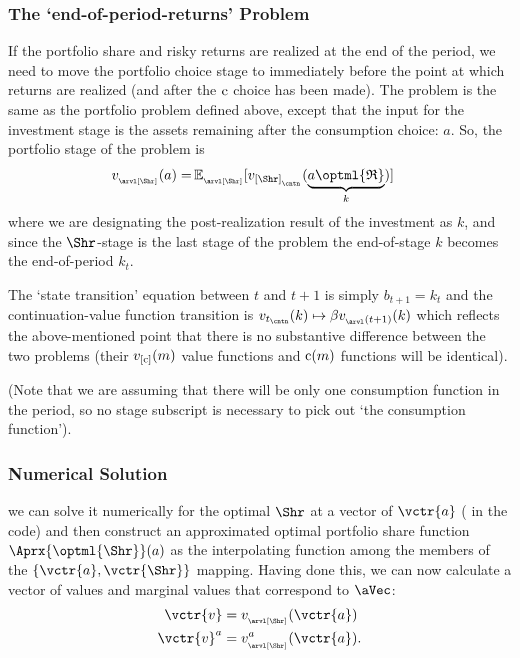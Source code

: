 \documentclass[titlepage, headings=optiontotocandhead]{Resources/texmf-local/tex/latex/econtex}
\begin{document}
\subsubsection{The `end-of-period-returns' Problem}

If the portfolio share and risky returns are realized at the end of the {period}, we need to move the portfolio choice {stage} to immediately before the point at which returns are realized (and after the $\mathrm{c}$ choice has been made).  The problem is the same as the portfolio problem defined above, except that the input for the investment {stage} is the assets remaining after the consumption choice: $a$.  So, the portfolio {stage} of the problem is
\begin{equation}\begin{gathered}\begin{aligned}
  v_{_\arvl[\Shr]}(a) = & \Ex_{_\arvl[\Shr]}[v_{[\Shr]_{_\cntn}}(\underbrace{a\optml{\Rport}}_{k})] %
    \end{aligned}\end{gathered}\end{equation}
where we are designating the post-realization result of the investment as $k$, and since the $\Shr$-{stage} is the last {stage} of the problem the end-of-{stage} $k$ becomes the end-of-{period} $k_{t}.$ 

The `state transition' equation between $t$ and $t+1$ is simply $b_{t+1} = k_{t}$ and the continuation-value function transition is $v_{t_\cntn}(k) \mapsto \beta v_{_\arvl(t+1)}(k)$ which reflects the above-mentioned point that there is no substantive difference between the two problems (their $v_{[\mathrm{c}]}(m)$ value functions and $\mathrm{c}(m)$ functions will be identical).

(Note that we are assuming that there will be only one consumption function in the period, so no {stage} subscript is necessary to pick out `the consumption function'). 

\subsubsection{Numerical Solution}
we can solve it numerically for the optimal $\Shr$ at a vector of $\vctr{a}$ ({\aVecCode} in the code)  and then construct an approximated optimal portfolio share function $\Aprx{\optml{\Shr}}(a)$ as the interpolating function among the members of the $\{\vctr{a},\vctr{\Shr}\}$ mapping.  Having done this, we can now calculate a vector of values and marginal values that correspond to $\aVec$:
\begin{equation}\begin{gathered}\begin{aligned}
      \vctr{v}  & = v_{_\arvl[\Shr]}(\vctr{a}) \label{eq:vShrEnd}
\\      \vctr{v}^a  & = v^{a}_{_\arvl[\Shr]}(\vctr{a}).
    \end{aligned}\end{gathered}\end{equation}
\end{document}
